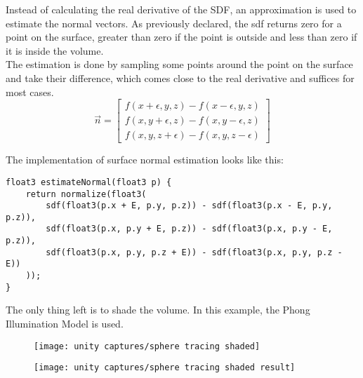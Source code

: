 \noindent
Instead of calculating the real derivative of the SDF, an approximation is used to estimate the normal vectors.
As previously declared, the \gls{sdf} returns zero for a point on the surface, greater than zero if the point is outside and less than zero if it is inside the volume. 
\\
The estimation is done by sampling some points around the point on the surface and take their difference, which comes close to the real derivative and suffices for most cases.
$$
\overrightarrow{n} = 
\left[
    \begin{matrix}
        f(x + \epsilon, y, z) - f(x - \epsilon, y, z) \\
        f(x, y + \epsilon, z) - f(x, y - \epsilon, z) \\
        f(x, y, z + \epsilon) - f(x, y, z - \epsilon)
       \end{matrix}
\right]
$$

\noindent
The implementation of surface normal estimation looks like this:

\begin{lstlisting}[language=HLSL, caption=Implementation of surface normal estimation., label=lst:shader:surfacenormal]
float3 estimateNormal(float3 p) {
    return normalize(float3(
        sdf(float3(p.x + E, p.y, p.z)) - sdf(float3(p.x - E, p.y, p.z)),
        sdf(float3(p.x, p.y + E, p.z)) - sdf(float3(p.x, p.y - E, p.z)),
        sdf(float3(p.x, p.y, p.z + E)) - sdf(float3(p.x, p.y, p.z - E))
    ));
}
\end{lstlisting}

\noindent
The only thing left is to shade the volume. In this example, the Phong Illumination Model is used. 

\begin{figure}[H]
    \centering
        \begin{minipage}{0.47\linewidth}
            \texttt{[image: unity captures/sphere tracing shaded]}
            \label{img:captures:spheretracing}
        \end{minipage}
    \hfill
        \begin{minipage}{0.47\linewidth}
            \texttt{[image: unity captures/sphere tracing shaded result]}
            \label{img:captures:spheretracing_rendered}
        \end{minipage}
\end{figure}
